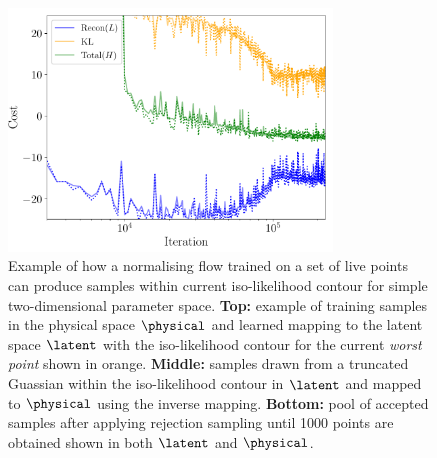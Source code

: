 \documentclass[aps,superscriptaddress,twocolumn,nopreprintnumbers,floatfix,groupedaddress]{revtex4-1}
\newcommand{\figwidth}{8.6cm}
\begin{document}
\begin{figure}
	\centering
	\includegraphics[width=\figwidth]{figs/cost.pdf}
	\caption{Example of how a normalising flow trained on a set of live points can produce samples within current iso-likelihood contour for simple two-dimensional parameter space. \textbf{Top:} example of training samples in the physical space $\physical$ and learned mapping to the latent space $\latent$ with the iso-likelihood contour for the current \textit{worst point} shown in orange. \textbf{Middle:} samples drawn from a truncated Guassian within the iso-likelihood contour in $\latent$ and mapped to $\physical$ using the inverse mapping. \textbf{Bottom:} pool of accepted samples after applying rejection sampling until 1000 points are obtained shown in both $\latent$ and $\physical$.}
	\label{fig:learning_contours}
\end{figure}
\end{document}
